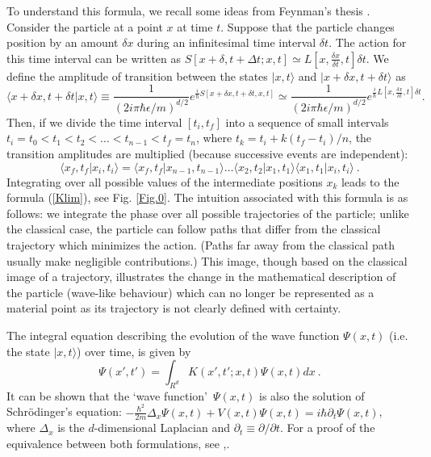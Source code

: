 \documentclass[12pt,aps,prb,preprint]{revtex4-1}   %
\begin{document}
To understand this formula, we recall some ideas from Feynman's
thesis \cite{Feynman2}. Consider the particle at a point $x$ at
time $t$. Suppose that the particle changes position by an amount
$\delta x$ during an infinitesimal time interval $\delta t$. The
action for this time interval can be written as $S[x+\delta,t+\Delta t;x,t] 
\simeq L[x,\frac{\delta x}{\delta t},t] \delta t$.
We define the amplitude of transition between the states
$|x,t\rangle $ and $|x+\delta x,t+\delta t\rangle $ as $$ \langle
x+\delta x,t+\delta t|x,t\rangle \equiv
\frac{1}{(2i\pi \hbar\epsilon/m)^{d/2}}
e^{\frac{i}{\hbar}S[x+\delta x,t+\delta t,x,t]}
\simeq\frac{1}{(2i\pi \hbar\epsilon/m)^{d/2}}
e^{\frac{i}{\hbar}L[x,\frac{\delta x}{\delta t},t]\delta t} .
$$ Then, if we divide the time interval $[t_i, t_f]$ into a
sequence of small intervals $t_i=t_0 < t_1 < t_2 < \ldots <
t_{n-1} < t_f=t_n $, where $t_k=t_i + k(t_f-t_i)/n$, the
transition amplitudes are multiplied (because successive events
are independent): $$ \langle x_f,t_f|x_i,t_i\rangle = \langle
x_f,t_f|x_{n-1},t_{n-1}\rangle \ldots \langle
x_2,t_2|x_1,t_1\rangle  \langle x_1,t_1|x_i,t_i\rangle\ .$$
Integrating over all possible values of the intermediate positions
$x_k$ leads to the formula (\ref{Klim}), see Fig. \ref{Fig.0}. The intuition associated
with this formula is as follows: we integrate the phase over all
possible trajectories of the particle; unlike the classical case,
the particle can follow paths that differ from the classical
trajectory which minimizes the action. (Paths far away from the
classical path usually make negligible contributions.) This image,
though based on the classical image of a trajectory, illustrates
the change in the mathematical description of the particle
(wave-like behaviour) which can no longer be represented as a
material point as its trajectory is not clearly defined with
certainty.

The integral equation describing the evolution of the wave
function $\Psi(x,t)$ (i.e. the state $|x,t\rangle$) over time, is
given by
\begin{equation}\label{ShroInt}
\Psi(x',t')=\int_{R^d} K(x',t';x,t)\Psi(x,t) dx\ .
\end{equation}
It can be shown that the \lq wave function\rq\ $\Psi(x,t)$ is also
the solution of Schr\"odinger's equation:
$-\frac{\hbar^2}{2m}\Delta_x\Psi(x,t)+V(x,t)\Psi(x,t)=i\hbar\partial_t\Psi(x,t)$,
where $\Delta_x$ is the $d$-dimensional Laplacian and
$\partial_t\equiv\partial/\partial t$. For a proof of the
equivalence between both formulations, see
\cite{FH},\cite{Feynman2}.
\end{document}
